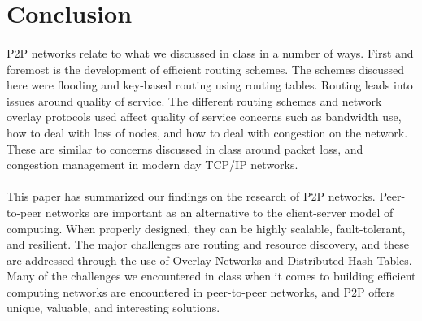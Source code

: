 \documentclass[12pt,letterpaper]{article}
\begin{document}

\section{Conclusion}

\paragraph{}
P2P networks relate to what we discussed in class in a number of ways.
First and foremost is the development of efficient routing schemes.
The schemes discussed here were flooding and key-based routing using routing tables.
Routing leads into issues around quality of service.
The different routing schemes and network overlay protocols used affect quality of service concerns such as bandwidth use, how to deal with loss of nodes, and how to deal with congestion on the network.
These are similar to concerns discussed in class around packet loss, and congestion management in modern day TCP/IP networks.

\paragraph{}
This paper has summarized our findings on the research of P2P networks.
Peer-to-peer networks are important as an alternative to the client-server model of computing.
When properly designed, they can be highly scalable, fault-tolerant, and resilient.
The major challenges are routing and resource discovery, and these are addressed through the use of Overlay Networks and Distributed Hash Tables.
Many of the challenges we encountered in class when it comes to building efficient computing networks are encountered in peer-to-peer networks, and P2P offers unique, valuable, and interesting solutions.



\end{document}
